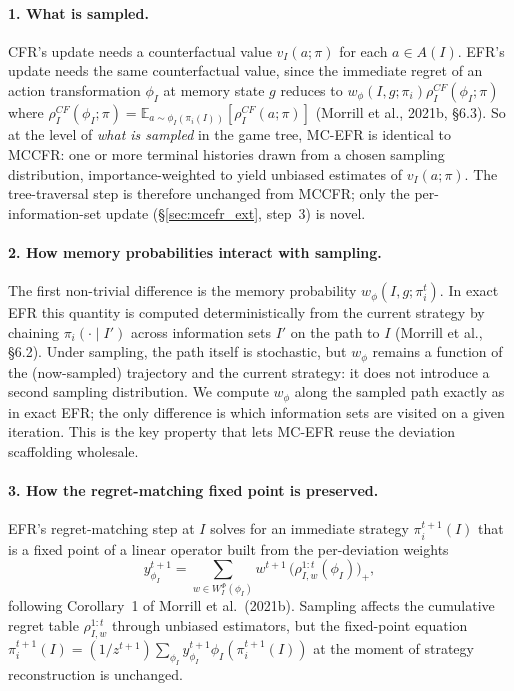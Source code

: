 \documentclass[11pt]{article}
\begin{document}
\paragraph{1. What is sampled.} CFR's update needs a counterfactual value $v_I(a;\pi)$ for each $a \in A(I)$. EFR's update needs the same counterfactual value, since the immediate regret of an action transformation $\phi_I$ at memory state $g$ reduces to $w_\phi(I,g;\pi_i)\rho^{CF}_I(\phi_I;\pi)$ where $\rho^{CF}_I(\phi_I;\pi) = \mathbb{E}_{a\sim\phi_I(\pi_i(I))}[\rho^{CF}_I(a;\pi)]$ (Morrill et al., 2021b, \S6.3). So at the level of \emph{what is sampled} in the game tree, MC-EFR is identical to MCCFR: one or more terminal histories drawn from a chosen sampling distribution, importance-weighted to yield unbiased estimates of $v_I(a;\pi)$. The tree-traversal step is therefore unchanged from MCCFR; only the per-information-set update (\S\ref{sec:mcefr_ext}, step~3) is novel.

\paragraph{2. How memory probabilities interact with sampling.} The first non-trivial difference is the memory probability $w_\phi(I,g;\pi_i^t)$. In exact EFR this quantity is computed deterministically from the current strategy by chaining $\pi_i(\cdot \mid I')$ across information sets $I'$ on the path to $I$ (Morrill et al., \S6.2). Under sampling, the path itself is stochastic, but $w_\phi$ remains a function of the (now-sampled) trajectory and the current strategy: it does not introduce a second sampling distribution. We compute $w_\phi$ along the sampled path exactly as in exact EFR; the only difference is which information sets are visited on a given iteration. This is the key property that lets MC-EFR reuse the deviation scaffolding wholesale.

\paragraph{3. How the regret-matching fixed point is preserved.} EFR's regret-matching step at $I$ solves for an immediate strategy $\pi_i^{t+1}(I)$ that is a fixed point of a linear operator built from the per-deviation weights
\[
y_{\phi_I}^{t+1} = \sum_{w \in W_I^\Phi(\phi_I)} w^{t+1}\,\bigl(\rho^{1:t}_{I,w}(\phi_I)\bigr)_+,
\]
following Corollary~1 of Morrill et al.\ (2021b). Sampling affects the cumulative regret table $\rho^{1:t}_{I,w}$ through unbiased estimators, but the fixed-point equation $\pi_i^{t+1}(I) = (1/z^{t+1}) \sum_{\phi_I} y^{t+1}_{\phi_I} \phi_I(\pi_i^{t+1}(I))$ at the moment of strategy reconstruction is unchanged.
\end{document}
